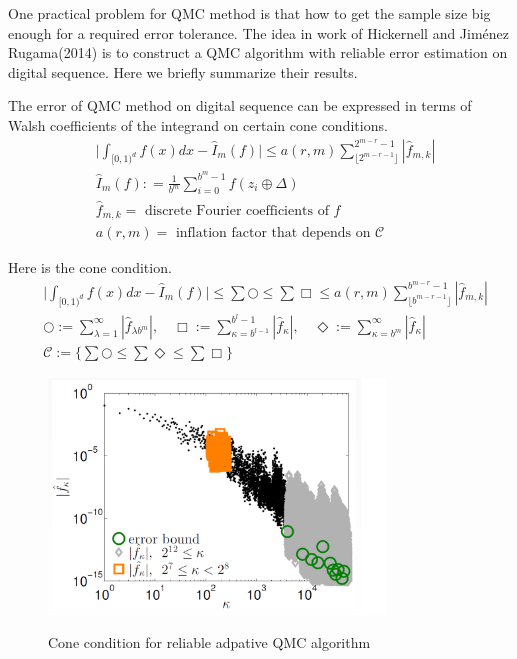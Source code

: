 

One practical problem for QMC method is that how to get the sample size big enough for a required error tolerance. The idea in work of Hickernell and Jiménez Rugama(2014)\cite{hickernell2014reliable} is to construct a QMC algorithm with reliable error estimation on digital sequence. Here we briefly summarize their results.

The error of QMC method on digital sequence can be expressed in terms of Walsh coefficients of the integrand on certain cone conditions. 
\begin{align*}
&\Big|\int_{[0,1)^d}f(x)dx - \hat{I}_m(f)\Big| \leq a(r,m) \sum_{\lfloor 2^{m-r-1} \rfloor}^{2^{m-r}-1} |\hat{f}_{m,k}|\\
&\hat{I}_m(f): = \frac{1}{b^m}\sum_{i=0}^{b^m-1}f(z_i\oplus \Delta)\\
&\hat{f}_{m,k}=\text{ discrete Fourier coefficients of }f\\
&a(r,m) =\text{ inflation factor that depends on } \mathcal{C}
\end{align*}

Here is the cone condition.
\begin{align*}
	&\Big|\int_{[0,1)^d}f(x)dx - \hat{I}_m(f)\Big|
    \leq \sum {\bigcirc} 
	\leq \sum {\Box}
	\leq a(r,m) \sum_{\lfloor b^{m-r-1} \rfloor}^{b^{m-r}-1}|\hat{f}_{m,k}|\\
    &\bigcirc:= \sum_{\lambda=1}^{\infty}| \hat{f}_{\lambda b^m}|,\quad  
    \Box:= \sum_{\kappa=b^{l-1}}^{b^l-1}|\hat{f}_\kappa|,\quad
    \Diamond:=\sum_{\kappa=b^m}^{\infty}|\hat{f}_{\kappa}|\\
    &\mathcal{C}:=\Big\{\sum{\bigcirc} \leq \sum{\Diamond} \leq \sum{\Box}\Big\}
\end{align*}

\begin{figure}[h]
    \centering
    \caption{Cone condition for reliable adpative QMC algorithm}
    \includegraphics[width=0.8\textwidth]{figures/cone.bmp}
    \label{fg:cone}
\end{figure}
